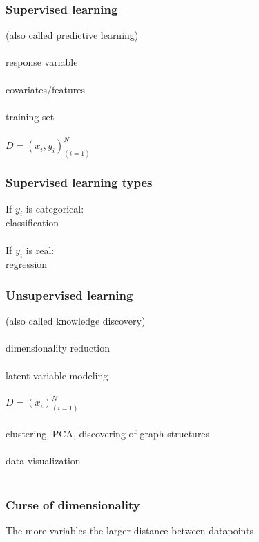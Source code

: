 \documentclass{beamer}
\begin{document}
\begin{frame}
	\frametitle{Supervised learning}
	\begin{center}
		(also called predictive learning)\\~\\
		response variable\\~\\
		covariates/features\\~\\
		training set\\~\\
		$D = (x_i,y_i)_{(i=1)}^N$
	\end{center}
\end{frame}

\begin{frame}
	\frametitle{Supervised learning types}
	\begin{center}
		If $y_i$ is categorical:\\
		classification\\~\\
		If $y_i$ is real:\\
		regression
	\end{center}
\end{frame}

\begin{frame}
	\frametitle{Unsupervised learning}
	\begin{center}
		(also called knowledge discovery)\\~\\
		dimensionality reduction\\~\\
		latent variable modeling\\~\\
		$D = (x_i)_{(i=1)}^N$ \\~\\
		clustering, PCA, discovering of graph structures\\~\\
		data visualization\\~\\
	\end{center}
\end{frame}

\begin{frame}
	\frametitle{Curse of dimensionality}
	\begin{center}
		The more variables the larger distance between datapoints\\~\\
	\end{center}
\end{frame}
\end{document}
